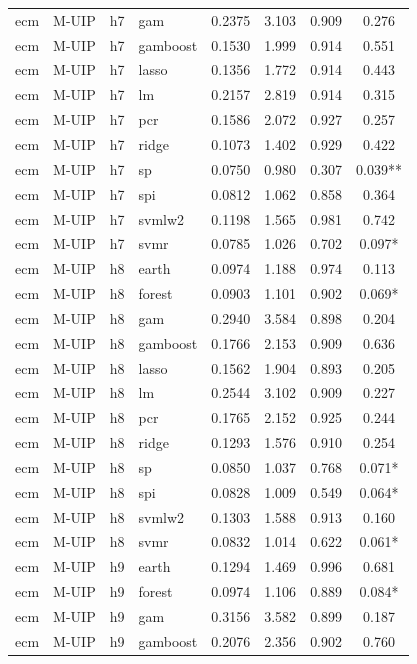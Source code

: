 \begin{ThreePartTable}
\begin{longtable}[t]{llclcccc}
ecm & M-UIP & h7 & gam & 0.2375 & 3.103 & 0.909 & 0.276\\
ecm & M-UIP & h7 & gamboost & 0.1530 & 1.999 & 0.914 & 0.551\\
ecm & M-UIP & h7 & lasso & 0.1356 & 1.772 & 0.914 & 0.443\\
ecm & M-UIP & h7 & lm & 0.2157 & 2.819 & 0.914 & 0.315\\
ecm & M-UIP & h7 & pcr & 0.1586 & 2.072 & 0.927 & 0.257\\
ecm & M-UIP & h7 & ridge & 0.1073 & 1.402 & 0.929 & 0.422\\
ecm & M-UIP & h7 & sp & 0.0750 & 0.980 & 0.307 & 0.039**\\
ecm & M-UIP & h7 & spi & 0.0812 & 1.062 & 0.858 & 0.364\\
ecm & M-UIP & h7 & svmlw2 & 0.1198 & 1.565 & 0.981 & 0.742\\
ecm & M-UIP & h7 & svmr & 0.0785 & 1.026 & 0.702 & 0.097*\\
\addlinespace
ecm & M-UIP & h8 & earth & 0.0974 & 1.188 & 0.974 & 0.113\\
ecm & M-UIP & h8 & forest & 0.0903 & 1.101 & 0.902 & 0.069*\\
ecm & M-UIP & h8 & gam & 0.2940 & 3.584 & 0.898 & 0.204\\
ecm & M-UIP & h8 & gamboost & 0.1766 & 2.153 & 0.909 & 0.636\\
ecm & M-UIP & h8 & lasso & 0.1562 & 1.904 & 0.893 & 0.205\\
ecm & M-UIP & h8 & lm & 0.2544 & 3.102 & 0.909 & 0.227\\
ecm & M-UIP & h8 & pcr & 0.1765 & 2.152 & 0.925 & 0.244\\
ecm & M-UIP & h8 & ridge & 0.1293 & 1.576 & 0.910 & 0.254\\
ecm & M-UIP & h8 & sp & 0.0850 & 1.037 & 0.768 & 0.071*\\
ecm & M-UIP & h8 & spi & 0.0828 & 1.009 & 0.549 & 0.064*\\
ecm & M-UIP & h8 & svmlw2 & 0.1303 & 1.588 & 0.913 & 0.160\\
ecm & M-UIP & h8 & svmr & 0.0832 & 1.014 & 0.622 & 0.061*\\
\addlinespace
ecm & M-UIP & h9 & earth & 0.1294 & 1.469 & 0.996 & 0.681\\
ecm & M-UIP & h9 & forest & 0.0974 & 1.106 & 0.889 & 0.084*\\
ecm & M-UIP & h9 & gam & 0.3156 & 3.582 & 0.899 & 0.187\\
ecm & M-UIP & h9 & gamboost & 0.2076 & 2.356 & 0.902 & 0.760\\

\end{longtable}
\end{ThreePartTable}

